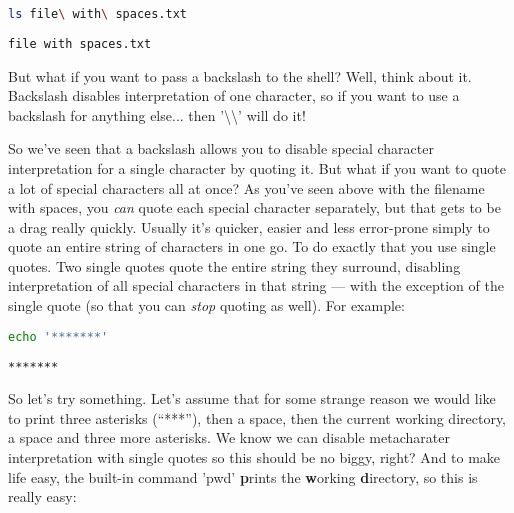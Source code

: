 \lstset{basicstyle=\scriptsize, numbers=left, captionpos=b, tabsize=4}
\begin{lstlisting}[caption=Listing the file using escapes,language={bash},
breaklines=true,xleftmargin=15pt,label=lst:Listing the file using escapes]
ls file\ with\ spaces.txt
\end{lstlisting}

\scriptsize
\begin{verbatim}
file with spaces.txt
\end{verbatim}
\normalsize

But what if you want to pass a backslash to the shell? Well, think about it.
Backslash disables interpretation of one character, so if you want to use a
backslash for anything else... then '\textbackslash{}\textbackslash{}' will do
it!

So we've seen that a backslash allows you to disable special character
interpretation for a single character by quoting it. But what if you want to
quote a lot of special characters all at once? As you've seen above with the
filename with spaces, you \emph{can} quote each special character separately,
but that gets to be a drag really quickly. Usually it's quicker, easier and
less error-prone simply to quote an entire string of characters in one go. To
do exactly that you use single quotes. Two single quotes quote the entire
string they surround, disabling interpretation of all special characters in
that string --- with the exception of the single quote (so that you can
\emph{stop} quoting as well). For example:
\lstset{basicstyle=\scriptsize, numbers=left, captionpos=b, tabsize=4}
\begin{lstlisting}[caption=Quoting to use lots of asterisks,language={bash},
breaklines=true,xleftmargin=15pt,label=lst:Quoting to use lots of asterisks]
echo '*******'
\end{lstlisting}

\scriptsize
\begin{verbatim}
*******
\end{verbatim}
\normalsize

So let's try something. Let's assume that for some strange reason we would like
to print three asterisks (``***''), then a space, then the current working
directory, a space and three more asterisks. We know we can disable
metacharater interpretation with single quotes so this should be no biggy,
right? And to make life easy, the built-in command 'pwd' \textbf{p}rints the
\textbf{w}orking \textbf{d}irectory, so this is really easy:

